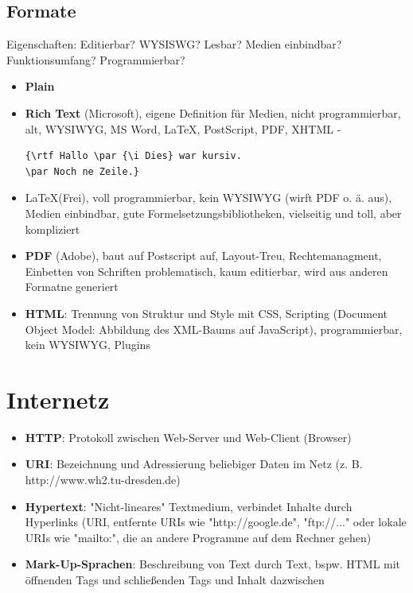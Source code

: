 \documentclass[12pt,landscape]{article}
\begin{document}
\begin{multicols}{3}
\subsection{Formate}
Eigenschaften: Editierbar? WYSISWG? Lesbar? Medien einbindbar? Funktionsumfang? Programmierbar?
\begin{itemize}
\item \textbf{Plain}
\item \textbf{Rich Text} (Microsoft), eigene Definition für Medien, nicht programmierbar, alt, WYSIWYG, MS Word, \LaTeX, PostScript, PDF, XHTML - \begin{lstlisting}
{\rtf Hallo \par {\i Dies} war kursiv.
\par Noch ne Zeile.}\end{lstlisting}
\item \LaTeX (Frei), voll programmierbar, kein WYSIWYG (wirft PDF o. ä. aus), Medien einbindbar, gute Formelsetzungsbibliotheken, vielseitig und toll, aber kompliziert
\item \textbf{PDF} (Adobe), baut auf Postscript auf, Layout-Treu, Rechtemanagment, Einbetten von Schriften problematisch, kaum editierbar, wird aus anderen Formatne generiert
\item \textbf{HTML}: Trennung von Struktur und Style mit CSS, Scripting (Document Object Model: Abbildung des XML-Baums auf JavaScript), programmierbar, kein WYSIWYG, Plugins
\end{itemize}
\section{Internetz}
\begin{itemize}
\item \textbf{HTTP}: Protokoll zwischen Web-Server und Web-Client (Browser)
\item \textbf{URI}: Bezeichnung und Adressierung beliebiger Daten im Netz (z. B. http://www.wh2.tu-dresden.de)
\item \textbf{Hypertext}: "Nicht-lineares" Textmedium, verbindet Inhalte durch Hyperlinks (URI, entfernte URIs wie "http://google.de", "ftp://..." oder lokale URIs wie "mailto:", die an andere Programme auf dem Rechner gehen)
\item \textbf{Mark-Up-Sprachen}: Beschreibung von Text durch Text, bspw. HTML mit öffnenden Tags und schließenden Tags und Inhalt dazwischen
\end{itemize}

\end{multicols}
\end{document}

